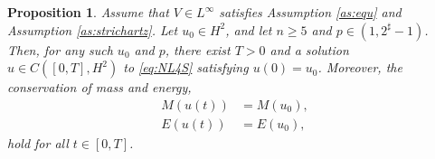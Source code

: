 \documentclass[11pt,a4paper]{article}
\numberwithin{equation}{section}
\newtheorem{proposition}[theorem]{Proposition}
\begin{document}
\begin{proposition}
Assume that $V \in L^{\infty}$ satisfies Assumption \ref{as:equ} and Assumption \ref{as:strichartz}. Let $u_{0} \in H^{2}$, and let $n \geq 5$ and $p \in (1, 2^{\sharp} -1)$. Then, for any such $u_{0}$ and $p$, there exist $T > 0$ and a solution $u \in C([0, T], H^{2})$ to \eqref{eq:NL4S} satisfying $u(0)=u_{0}$. Moreover, the conservation of mass and energy,
\begin{equation}\label{mass energy con}
\begin{aligned}
M(u(t)) &= M(u_{0}), \\
E(u(t)) &= E(u_{0}),
\end{aligned}
\end{equation}
hold for all $t \in [0, T]$.
\end{proposition}
\end{document}

